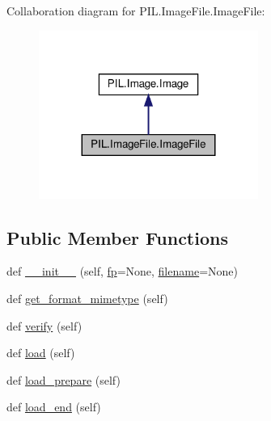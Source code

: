 Collaboration diagram for P\+I\+L.\+Image\+File.\+Image\+File\+:
\nopagebreak
\begin{figure}[H]
\begin{center}
\leavevmode
\includegraphics[width=203pt]{classPIL_1_1ImageFile_1_1ImageFile__coll__graph}
\end{center}
\end{figure}
\subsection*{Public Member Functions}
\begin{DoxyCompactItemize}
\item 
def \hyperlink{classPIL_1_1ImageFile_1_1ImageFile_ad38bf9c49fa69c05ed68d5237be48314}{\+\_\+\+\_\+init\+\_\+\+\_\+} (self, \hyperlink{classPIL_1_1ImageFile_1_1ImageFile_a089dd3e057c67403a36d73fcdae09009}{fp}=None, \hyperlink{classPIL_1_1ImageFile_1_1ImageFile_a8c0859e3d3dc0631584f800d1daeaee7}{filename}=None)
\item 
def \hyperlink{classPIL_1_1ImageFile_1_1ImageFile_a7055f592e8818354e7667f8f69dcd245}{get\+\_\+format\+\_\+mimetype} (self)
\item 
def \hyperlink{classPIL_1_1ImageFile_1_1ImageFile_ac0135bd6c5e8a53f7955b33373bc9a68}{verify} (self)
\item 
def \hyperlink{classPIL_1_1ImageFile_1_1ImageFile_a23c145c60ea3d5bbd49a3093824db3ff}{load} (self)
\item 
def \hyperlink{classPIL_1_1ImageFile_1_1ImageFile_aaf6b870f18cc00b6a708da1e2fe61f03}{load\+\_\+prepare} (self)
\item 
def \hyperlink{classPIL_1_1ImageFile_1_1ImageFile_a98cff3cc6ec414ad07f539b7dc771d88}{load\+\_\+end} (self)
\end{DoxyCompactItemize}
